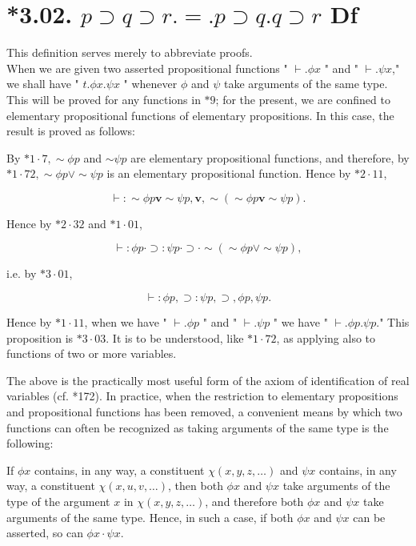 \documentclass[10pt]{article}
\begin{document}
\section*{*3.02. $p \supset q \supset r .=. p \supset q . q \supset r$ Df}
This definition serves merely to abbreviate proofs.\\
When we are given two asserted propositional functions " $\vdash . \phi x$ " and " $\vdash . \psi x$," we shall have " $t . \phi x . \psi x$ " whenever $\phi$ and $\psi$ take arguments of the same type. This will be proved for any functions in $* 9$; for the present, we are confined to elementary propositional functions of elementary propositions. In this case, the result is proved as follows:

By $* 1 \cdot 7, \sim \phi p$ and $\sim \psi p$ are elementary propositional functions, and therefore, by $* 1 \cdot 72, \sim \phi p \vee \sim \psi p$ is an elementary propositional function. Hence by $* 2 \cdot 11$,

$$
\vdash: \sim \phi p \mathbf{v} \sim \psi p, \mathbf{v}, \sim(\sim \phi p \mathbf{v} \sim \psi p) .
$$

Hence by $* 2 \cdot 32$ and $* 1 \cdot 01$,

$$
\vdash: \phi p \cdot \supset: \psi p \cdot \supset \cdot \sim(\sim \phi p \vee \sim \psi p),
$$

i.e. by $* 3 \cdot 01$,

$$
\vdash: \phi p, \supset: \psi p, \supset, \phi p, \psi p .
$$

Hence by $* 1 \cdot 11$, when we have " $\vdash . \phi p$ " and " $\vdash . \psi p$ " we have " $\vdash . \phi p . \psi p$." This proposition is $* 3 \cdot 03$. It is to be understood, like $* 1 \cdot 72$, as applying also to functions of two or more variables.

The above is the practically most useful form of the axiom of identification of real variables (cf. *172). In practice, when the restriction to elementary propositions and propositional functions has been removed, a convenient means by which two functions can often be recognized as taking arguments of the same type is the following:

If $\phi x$ contains, in any way, a constituent $\chi(x, y, z, \ldots)$ and $\psi x$ contains, in any way, a constituent $\chi(x, u, v, \ldots)$, then both $\phi x$ and $\psi x$ take arguments of the type of the argument $x$ in $\chi(x, y, z, \ldots)$, and therefore both $\phi x$ and $\psi x$ take arguments of the same type. Hence, in such a case, if both $\phi x$ and $\psi x$ can be asserted, so can $\phi x \cdot \psi x$.
\end{document}
